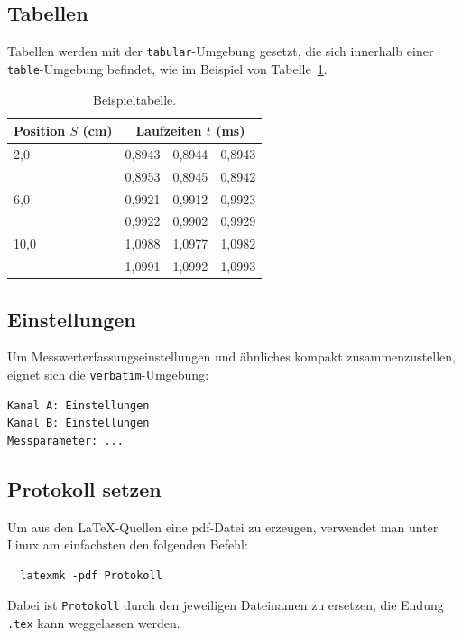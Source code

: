 \documentclass[twoside]{protokoll}
\begin{document}
\subsection*{Tabellen}
Tabellen werden mit der \texttt{tabular}-Umgebung gesetzt, die sich
innerhalb einer \texttt{table}-Umgebung befindet, wie im Beispiel von
Tabelle~\ref{tab:beispieltabelle}.
\begin{table}[h]
  \centering
  \begin{tabular}{l|ccc}
    Position $S$ (cm) & \multicolumn{3}{|c}{Laufzeiten $t$ (ms)} \\ \hline
     2,0 & 0,8943 & 0,8944 & 0,8943 \\
         & 0,8953 & 0,8945 & 0,8942 \\ \hline
     6,0 & 0,9921 & 0,9912 & 0,9923 \\
         & 0,9922 & 0,9902 & 0,9929 \\ \hline
    10,0 & 1,0988 & 1,0977 & 1,0982 \\
         & 1,0991 & 1,0992 & 1,0993 \\ \hline
  \end{tabular}
  \caption{Beispieltabelle.}
  \label{tab:beispieltabelle}
\end{table}

\subsection*{Einstellungen}
Um Messwerterfassungseinstellungen und ähnliches kompakt
zusammenzustellen, eignet sich die \texttt{verbatim}-Umgebung:
\begin{verbatim}
Kanal A: Einstellungen
Kanal B: Einstellungen
Messparameter: ...
\end{verbatim}

\subsection*{Protokoll setzen}
Um aus den \LaTeX{}-Quellen eine pdf-Datei zu erzeugen, verwendet man
unter Linux am einfachsten den folgenden Befehl:
\begin{verbatim}
  latexmk -pdf Protokoll
\end{verbatim}

\noindent Dabei ist \texttt{Protokoll} durch den jeweiligen Dateinamen zu
ersetzen, die Endung \texttt{.tex} kann weggelassen werden.

%
%
\clearpage
\end{document}
